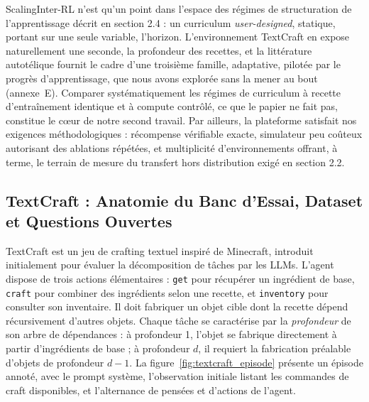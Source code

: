 \documentclass[11pt,a4paper]{article}
\begin{document}
ScalingInter-RL n'est qu'un point dans l'espace des régimes de structuration de l'apprentissage décrit en section 2.4 : un curriculum \emph{user-designed}, statique, portant sur une seule variable, l'horizon. L'environnement TextCraft en expose naturellement une seconde, la profondeur des recettes, et la littérature autotélique fournit le cadre d'une troisième famille, adaptative, pilotée par le progrès d'apprentissage, que nous avons explorée sans la mener au bout (annexe~E). Comparer systématiquement les régimes de curriculum à recette d'entraînement identique et à compute contrôlé, ce que le papier ne fait pas, constitue le cœur de notre second travail. Par ailleurs, la plateforme satisfait nos exigences méthodologiques : récompense vérifiable exacte, simulateur peu coûteux autorisant des ablations répétées, et multiplicité d'environnements offrant, à terme, le terrain de mesure du transfert hors distribution exigé en section 2.2.




\subsection{TextCraft : Anatomie du Banc d'Essai, Dataset et Questions Ouvertes}

TextCraft \cite{prasad2023adapt} est un jeu de crafting textuel inspiré de Minecraft, introduit initialement pour évaluer la décomposition de tâches par les LLMs. L'agent dispose de trois actions élémentaires : \texttt{get} pour récupérer un ingrédient de base, \texttt{craft} pour combiner des ingrédients selon une recette, et \texttt{inventory} pour consulter son inventaire. Il doit fabriquer un objet cible dont la recette dépend récursivement d'autres objets. Chaque tâche se caractérise par la \emph{profondeur} de son arbre de dépendances : à profondeur 1, l'objet se fabrique directement à partir d'ingrédients de base ; à profondeur $d$, il requiert la fabrication préalable d'objets de profondeur $d-1$. La figure~\ref{fig:textcraft_episode} présente un épisode annoté, avec le prompt système, l'observation initiale listant les commandes de craft disponibles, et l'alternance de pensées et d'actions de l'agent.
\end{document}
